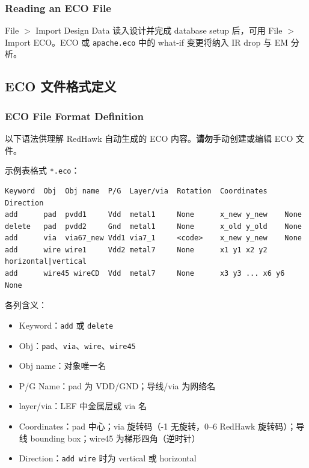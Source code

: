 \subsubsection*{Reading an ECO File}

File $>$ Import Design Data 读入设计并完成 database setup 后，可用 File $>$ Import ECO。ECO 或 \texttt{apache.eco} 中的 what-if 变更将纳入 IR drop 与 EM 分析。

\subsection{ECO 文件格式定义}
\subsubsection*{ECO File Format Definition}

\begin{noteBox}
以下语法供理解 RedHawk 自动生成的 ECO 内容。\textbf{请勿}手动创建或编辑 ECO 文件。
\end{noteBox}

示例表格式 \texttt{*.eco}：
\begin{lstlisting}
Keyword  Obj  Obj name  P/G  Layer/via  Rotation  Coordinates  Direction
add      pad  pvdd1     Vdd  metal1     None      x_new y_new    None
delete   pad  pvdd2     Gnd  metal1     None      x_old y_old    None
add      via  via67_new Vdd1 via7_1     <code>    x_new y_new    None
add      wire wire1     Vdd2 metal7     None      x1 y1 x2 y2    horizontal|vertical
add      wire45 wireCD  Vdd  metal7     None      x3 y3 ... x6 y6  None
\end{lstlisting}

各列含义：
\begin{itemize}
  \item Keyword：\texttt{add} 或 \texttt{delete}
  \item Obj：\texttt{pad}、\texttt{via}、\texttt{wire}、\texttt{wire45}
  \item Obj name：对象唯一名
  \item P/G Name：pad 为 VDD/GND；导线/via 为网络名
  \item layer/via：LEF 中金属层或 via 名
  \item Coordinates：pad 中心；via 旋转码（-1 无旋转，0--6 RedHawk 旋转码）；导线 bounding box；wire45 为梯形四角（逆时针）
  \item Direction：\texttt{add wire} 时为 vertical 或 horizontal
\end{itemize}

